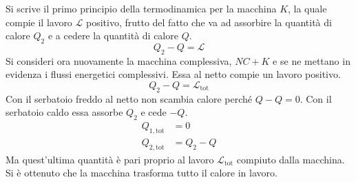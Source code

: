 \documentclass[10pt,a4paper]{book}
\begin{document}
\begin{figure}[htpb]
\end{figure}
\FloatBarrier
Si scrive il primo principio della termodinamica per la macchina $K$, la quale compie il lavoro $	\mathcal{L}$ positivo, frutto del fatto che va ad assorbire la quantità di calore $Q_2$ e a cedere la quantità di calore $Q$.
\[
	Q_2 - Q = \mathcal{L}
\]
Si consideri ora nuovamente la macchina complessiva, $NC+K$ e se ne mettano in evidenza i flussi energetici complessivi. Essa al netto compie un lavoro positivo.
\[
	Q_2 - Q = \mathcal{L}_\text{tot}
\]
Con il serbatoio freddo al netto non scambia calore perché $Q-Q=0$. Con il serbatoio caldo essa assorbe $Q_2$ e cede $-Q$.
\begin{align*}
	Q_{1,\text{tot}} &= 0 \\
	Q_{2,\text{tot} } &= Q_2 - Q
\end{align*}
Ma quest'ultima quantità è pari proprio al lavoro $\mathcal{L}_\text{tot}$ compiuto dalla macchina. Si è ottenuto che la macchina trasforma tutto il calore in lavoro.
\end{document}
